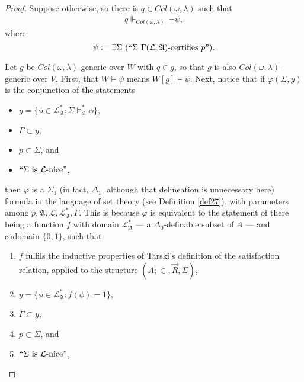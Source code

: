 \documentclass[12pt]{article}
\numberwithin{equation}{section}
\begin{document}
\begin{proof}
Suppose otherwise, so there is $q \in Col(\omega, \lambda)$ such that
\begin{align}
    \label{eq10} q \Vdash_{Col(\omega, \lambda)} \ \neg \psi,
\end{align}
where $$\psi := \exists \Sigma \ (``\Sigma \ \Gamma(\mathcal{L}, \mathfrak{A}) \text{-certifies } p").$$

Let $g$ be $Col(\omega, \lambda)$-generic over $W$ with $q \in g$, so that $g$ is also $Col(\omega, \lambda)$-generic over $V$. First, that $W \models \psi$ means $W[g] \models \psi$. Next, notice that if $\varphi(\Sigma, y)$ is the conjunction of the statements
\begin{itemize}
    \item $y = \{\phi \in \mathcal{L}^*_{\mathfrak{A}} : \Sigma \models^*_{\mathfrak{A}} \phi\}$,
    \item $\Gamma \subset y$, 
    \item $p \subset \Sigma$, and
    \item $``\Sigma \text{ is } \mathcal{L}\text{-nice}"$, 
\end{itemize}
then $\varphi$ is a $\Sigma_1$ (in fact, $\Delta_1$, although that delineation is unnecessary here) formula in the language of set theory (see Definition \ref{def27}), with parameters among $p, \mathfrak{A}, \mathcal{L}, \mathcal{L}^*_{\mathfrak{A}}, \Gamma$. This is because $\varphi$ is equivalent to the statement of there being a function $f$ with domain $\mathcal{L}^*_{\mathfrak{A}}$ --- a $\Delta_0$-definable subset of $A$ --- and codomain $\{0, 1\}$, such that 
\begin{enumerate}[label=(\alph*)]
    \item $f$ fulfils the inductive properties of Tarski's definition of the satisfaction relation, applied to the structure $(A; \in, \Vec{R}, \Sigma)$,
    \item $y = \{\phi \in \mathcal{L}^*_{\mathfrak{A}} : f(\phi) = 1\}$, 
    \item $\Gamma \subset y$,
    \item $p \subset \Sigma$, and
    \item $``\Sigma \text{ is } \mathcal{L}\text{-nice}"$,
\end{enumerate}

\end{proof}
\end{document}
